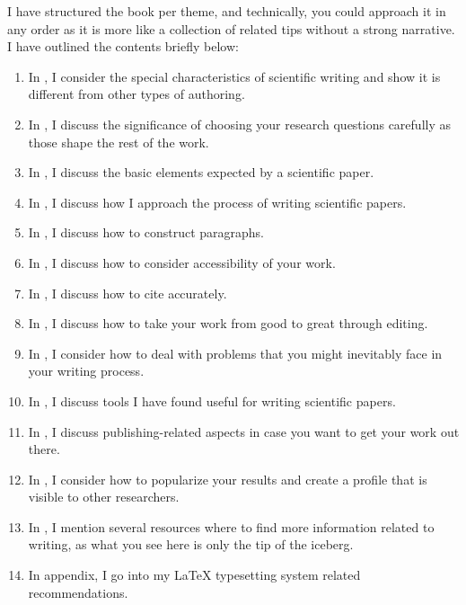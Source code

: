 I have structured the book per theme, and technically, you could approach it in any order as it is more like a collection of related tips without a strong narrative.
I have outlined the contents briefly below:

\begin{enumerate}
    \item In , I consider the special characteristics of scientific writing and show it is different from other types of authoring.
    \item In , I discuss the significance of choosing your research questions carefully as those shape the rest of the work.
    \item In , I discuss the basic elements expected by a scientific paper.
    \item In , I discuss how I approach the process of writing scientific papers.
    \item In , I discuss how to construct paragraphs.
    \item In , I discuss how to consider accessibility of your work.
    \item In , I discuss how to cite accurately.
    \item In , I discuss how to take your work from good to great through editing.
    \item In , I consider how to deal with problems that you might inevitably face in your writing process.
    \item In , I discuss tools I have found useful for writing scientific papers.
    \item In , I discuss publishing-related aspects in case you want to get your work out there.
    \item In , I consider how to popularize your results and create a profile that is visible to other researchers.
    \item In , I mention several resources where to find more information related to writing, as what you see here is only the tip of the iceberg.
    \item In  appendix, I go into my LaTeX typesetting system related recommendations.
\end{enumerate}

